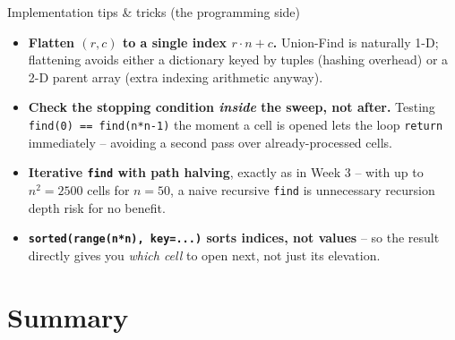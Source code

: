 \documentclass[11pt,aspectratio=169]{beamer}
\begin{document}
\begin{frame}{Implementation tips \& tricks (the programming side)}
  \small
  \begin{itemize}
    \item \textbf{Flatten $(r,c)$ to a single index $r\cdot n + c$.} Union-Find
    is naturally 1-D; flattening avoids either a dictionary keyed by tuples
    (hashing overhead) or a 2-D parent array (extra indexing arithmetic anyway).
    \item \textbf{Check the stopping condition \emph{inside} the sweep, not
    after.} Testing \texttt{find(0) == find(n*n-1)} the moment a cell is opened
    lets the loop \texttt{return} immediately -- avoiding a second pass over
    already-processed cells.
    \item \textbf{Iterative \texttt{find} with path halving}, exactly as in
    Week 3 -- with up to $n^2 = 2500$ cells for $n=50$, a naive recursive
    \texttt{find} is unnecessary recursion depth risk for no benefit.
    \item \textbf{\texttt{sorted(range(n*n), key=...)} sorts indices, not
    values} -- so the result directly gives you \emph{which cell} to open next,
    not just its elevation.
  \end{itemize}
\end{frame}

\section{Summary}
\end{document}
